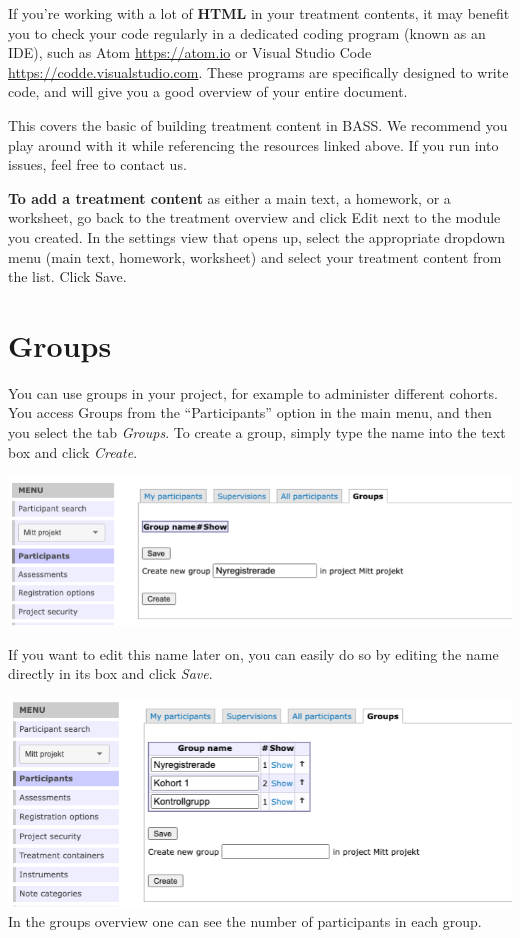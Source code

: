 \documentclass[
]{book}
\begin{document}
If you're working with a lot of \textbf{HTML} in your treatment contents, it may benefit you to check your code regularly in a dedicated coding program (known as an IDE), such as Atom \url{https://atom.io} or Visual Studio Code \href{https://code.visualstudio.com}{https://codde.visualstudio.com}. These programs are specifically designed to write code, and will give you a good overview of your entire document.

This covers the basic of building treatment content in BASS. We recommend you play around with it while referencing the resources linked above. If you run into issues, feel free to contact us.

\textbf{To add a treatment content} as either a main text, a homework, or a worksheet, go back to the treatment overview and click Edit next to the module you created. In the settings view that opens up, select the appropriate dropdown menu (main text, homework, worksheet) and select your treatment content from the list. Click Save.

\chapter{Groups}\label{groups}

You can use groups in your project, for example to administer different cohorts. You access Groups from the ``Participants'' option in the main menu, and then you select the tab \emph{Groups}.
To create a group, simply type the name into the text box and click \emph{Create}.

\includegraphics{images/groups.png}

If you want to edit this name later on, you can easily do so by editing the name directly in its box and click \emph{Save}.

\includegraphics{images/GroupsList.png}
In the groups overview one can see the number of participants in each group.
\end{document}
